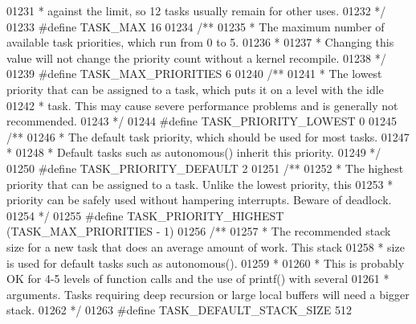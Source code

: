 \begin{DoxyCode}
{{{{{{{{{01231 \textcolor{comment}{ * against the limit, so 12 tasks usually remain for other uses.}
01232 \textcolor{comment}{ */}
01233 \textcolor{preprocessor}{#}\textcolor{preprocessor}{define} \textcolor{preprocessor}{TASK\_MAX} 16
01234 \textcolor{comment}{/**}
01235 \textcolor{comment}{ * The maximum number of available task priorities, which run from 0 to 5.}
01236 \textcolor{comment}{ *}
01237 \textcolor{comment}{ * Changing this value will not change the priority count without a kernel recompile.}
01238 \textcolor{comment}{ */}
01239 \textcolor{preprocessor}{#}\textcolor{preprocessor}{define} \textcolor{preprocessor}{TASK\_MAX\_PRIORITIES} 6
01240 \textcolor{comment}{/**}
01241 \textcolor{comment}{ * The lowest priority that can be assigned to a task, which puts it on a level with the idle}
01242 \textcolor{comment}{ * task. This may cause severe performance problems and is generally not recommended.}
01243 \textcolor{comment}{ */}
01244 \textcolor{preprocessor}{#}\textcolor{preprocessor}{define} \textcolor{preprocessor}{TASK\_PRIORITY\_LOWEST} 0
01245 \textcolor{comment}{/**}
01246 \textcolor{comment}{ * The default task priority, which should be used for most tasks.}
01247 \textcolor{comment}{ *}
01248 \textcolor{comment}{ * Default tasks such as autonomous() inherit this priority.}
01249 \textcolor{comment}{ */}
01250 \textcolor{preprocessor}{#}\textcolor{preprocessor}{define} \textcolor{preprocessor}{TASK\_PRIORITY\_DEFAULT} 2
01251 \textcolor{comment}{/**}
01252 \textcolor{comment}{ * The highest priority that can be assigned to a task. Unlike the lowest priority, this}
01253 \textcolor{comment}{ * priority can be safely used without hampering interrupts. Beware of deadlock.}
01254 \textcolor{comment}{ */}
01255 \textcolor{preprocessor}{#}\textcolor{preprocessor}{define} \textcolor{preprocessor}{TASK\_PRIORITY\_HIGHEST} \textcolor{preprocessor}{(}TASK_MAX_PRIORITIES \textcolor{preprocessor}{-} 1\textcolor{preprocessor}{)}
01256 \textcolor{comment}{/**}
01257 \textcolor{comment}{ * The recommended stack size for a new task that does an average amount of work. This stack}
01258 \textcolor{comment}{ * size is used for default tasks such as autonomous().}
01259 \textcolor{comment}{ *}
01260 \textcolor{comment}{ * This is probably OK for 4-5 levels of function calls and the use of printf() with several}
01261 \textcolor{comment}{ * arguments. Tasks requiring deep recursion or large local buffers will need a bigger stack.}
01262 \textcolor{comment}{ */}
01263 \textcolor{preprocessor}{#}\textcolor{preprocessor}{define} \textcolor{preprocessor}{TASK\_DEFAULT\_STACK\_SIZE} 512
}}}}}}}}}
\end{DoxyCode}
